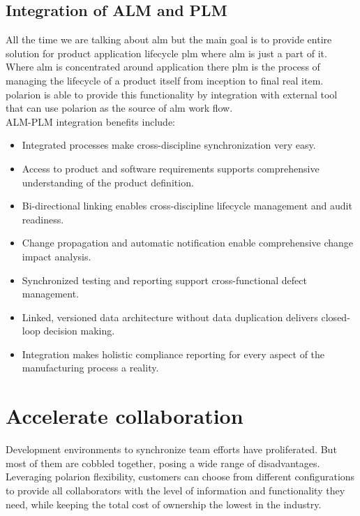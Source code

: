 \documentclass[thesis=M,english]{FITthesis}[2012/06/26]
\begin{document}
\subsection{Integration of ALM and PLM}

All the time we are talking about \acrshort{alm} but the main goal is to provide entire solution for product application lifecycle \acrshort{plm} where \acrshort{alm} is just a part of it. Where \acrshort{alm} is concentrated around application there \acrshort{plm} is the process of managing the lifecycle of a product itself from inception to final real item. \acrshort{polarion} is able to provide this functionality by integration with external tool that can use \acrshort{polarion} as the source of \acrshort{alm} work flow.\\

ALM-PLM integration benefits include:

\begin{itemize}[nosep]
	\item Integrated processes make cross-discipline synchronization
	very easy.
	\item Access to product and software requirements supports
	comprehensive understanding of the product definition.
	\item Bi-directional linking enables cross-discipline lifecycle
	management and audit readiness.
	\item Change propagation and automatic notification enable
	comprehensive change impact analysis.
	\item Synchronized testing and reporting support cross-functional
	defect management.
	\item Linked, versioned data architecture without data duplication
	delivers closed-loop decision making.
	\item Integration makes holistic compliance reporting for every
	aspect of the manufacturing process a reality.
\end{itemize}

\section{Accelerate collaboration}

Development environments to synchronize team efforts have proliferated. But most of them are cobbled together, posing a wide range of disadvantages. Leveraging \acrshort{polarion} flexibility, customers can choose from different configurations to provide all collaborators with the level of information and functionality they need, while keeping the total cost of ownership the lowest in the industry.
\end{document}
